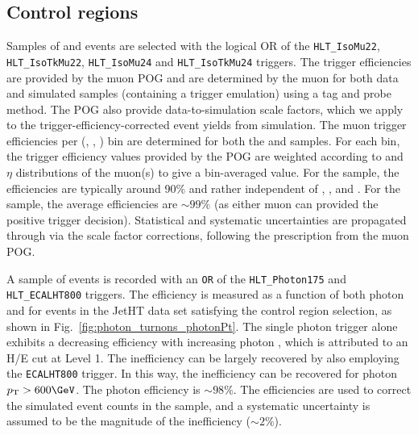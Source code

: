 \subsection{Control regions\label{sec:control_samples}}

Samples of \mj and \mmj events are selected with the logical OR of the
\verb!HLT_IsoMu22!, \verb!HLT_IsoTkMu22!, \verb!HLT_IsoMu24! and
\verb!HLT_IsoTkMu24! triggers. The trigger efficiencies are provided
by the muon POG and are determined by the muon for both data and
simulated samples (containing a trigger emulation) using a tag and
probe method. The POG also provide data-to-simulation scale factors,
which we apply to the trigger-efficiency-corrected event yields from
simulation. The muon trigger efficiencies per (\njet, \nb, \scalht)
bin are determined for both the \mj and \mmj samples. For each bin,
the trigger efficiency values provided by the POG are weighted
according to \Pt and $\eta$ distributions of the muon(s) to give a
bin-averaged value. For the \mj sample, the efficiencies are typically
around 90\% and rather independent of \njet, \nb, and \scalht. For the
\mmj sample, the average efficiencies are $\sim99\%$ (as either muon
can provided the positive trigger decision). Statistical and
systematic uncertainties are propagated through via the scale factor
corrections, following the prescription from the muon POG.

A sample of \gj events is recorded with an \verb!OR! of the
\verb!HLT_Photon175! and \verb!HLT_ECALHT800! triggers. The efficiency
is measured as a function of both photon \Pt and \HTmiss for events in
the JetHT data set satisfying the \gj control region selection, as
shown in Fig.~\ref{fig:photon_turnons_photonPt}. The single photon
trigger alone exhibits a decreasing efficiency with increasing photon
\Pt, which is attributed to an H/E cut at Level 1. The inefficiency
can be largely recovered by also employing the \verb!ECALHT800!
trigger. In this way, the inefficiency can be recovered for photon
$\Pt > 600\GeV$. The photon efficiency is $\sim 98\%$. The
efficiencies are used to correct the simulated event counts in the \gj
sample, and a systematic uncertainty is assumed to be the magnitude of
the inefficiency ($\sim 2\%$).



